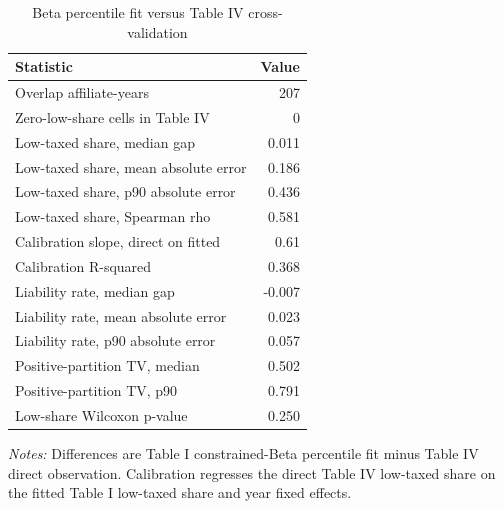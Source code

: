 \begin{table}[H]
\centering
\small
\setlength{\tabcolsep}{4pt}
\caption[Beta percentile fit versus Table IV cross-validation]{Beta percentile fit versus Table IV cross-validation}
\label{tab:app_stage1_crossval}
\begin{tabular}{@{}lr@{}}
\toprule
Statistic & Value \\
\midrule
Overlap affiliate-years & 207 \\
Zero-low-share cells in Table IV & 0 \\
Low-taxed share, median gap & 0.011 \\
Low-taxed share, mean absolute error & 0.186 \\
Low-taxed share, p90 absolute error & 0.436 \\
Low-taxed share, Spearman rho & 0.581 \\
Calibration slope, direct on fitted & 0.61 \\
Calibration R-squared & 0.368 \\
Liability rate, median gap & -0.007 \\
Liability rate, mean absolute error & 0.023 \\
Liability rate, p90 absolute error & 0.057 \\
Positive-partition TV, median & 0.502 \\
Positive-partition TV, p90 & 0.791 \\
Low-share Wilcoxon p-value & 0.250 \\
\bottomrule
\end{tabular}

\vspace{0.35em}
\noindent\begin{minipage}{\textwidth}
\footnotesize\raggedright\textit{Notes:} Differences are Table I constrained-Beta percentile fit minus Table IV direct observation. Calibration regresses the direct Table IV low-taxed share on the fitted Table I low-taxed share and year fixed effects.
\end{minipage}
\end{table}
